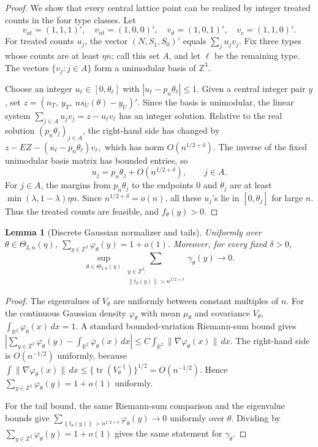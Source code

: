 \documentclass[12pt,reqno]{amsart}
\theoremstyle{theorem}
\newtheorem{lem}{Lemma}[section]
\theoremstyle{definition}
\newcommand{\0}{\mathbf{0}}
\newcommand{\1}{\mathbf{1}}
\begin{document}
\begin{proof}
We show that every central lattice point can be realized by integer treated
counts in the four type classes.  Let
\[
v_{at}=(1,1,1)',\quad
v_{nt}=(1,0,0)',\quad
v_d=(1,0,1)',\quad
v_c=(1,1,0)'.
\]
For treated counts \(u_j\), the vector \((N,S_1,S_0)'\) equals
\(\sum_j u_jv_j\).  Fix three types whose counts are at least \(\eta n\); call
this set \(A\), and let \(\ell\) be the remaining type.  The vectors
\(\{v_j:j\in A\}\) form a unimodular basis of \(\mathbb Z^3\).

Choose an integer \(u_\ell\in[0,\theta_\ell]\) with
\(|u_\ell-p_n\theta_\ell|\le1\).  Given a central integer pair \(y\), set
\(
z=(n_T,\ y_T,\ ns_U(\theta)-y_U)'.
\)
Since the basis is unimodular, the linear system
\(
\sum_{j\in A}u_jv_j=z-u_\ell v_\ell
\)
has an integer solution.  Relative to the real solution
\((p_n\theta_j)_{j\in A}\), the right-hand side has changed by
\(
z-E Z-(u_\ell-p_n\theta_\ell)v_\ell,
\)
which has norm \(O(n^{1/2+\delta})\).  The inverse of the fixed unimodular basis
matrix has bounded entries, so
\[
u_j=p_n\theta_j+O(n^{1/2+\delta}),\qquad j\in A.
\]
For \(j\in A\), the margins from \(p_n\theta_j\) to the endpoints \(0\) and
\(\theta_j\) are at least \(\min(\lambda,1-\lambda)\eta n\).  Since
\(n^{1/2+\delta}=o(n)\), all these \(u_j\)'s lie in \([0,\theta_j]\) for large
\(n\).  Thus the treated counts are feasible, and \(f_\theta(y)>0\).
\end{proof}

\begin{lem}[Discrete Gaussian normalizer and tails]\label{lem:gaussian-normalizer}
Uniformly over \(\theta\in\Theta_{3,n}(\eta)\),
\(
\sum_{y\in\mathbb Z^2}\varphi_\theta(y)=1+o(1).
\)
Moreover, for every fixed \(\delta>0\),
\[
\sup_{\theta\in\Theta_{3,n}(\eta)}
\sum_{\substack{y\in\mathbb Z^2: \\ \|t_\theta(y)\|>n^{1/2+\delta}}}\gamma_\theta(y)\to0.
\]
\end{lem}

\begin{proof}
The eigenvalues of \(V_\theta\) are uniformly between constant multiples of
\(n\).  For the continuous Gaussian density \(\varphi_\theta\) with mean
\(\mu_\theta\) and covariance \(V_\theta\),
\(
\int_{\mathbb R^2}\varphi_\theta(x)\,dx=1.
\)
A standard bounded-variation Riemann-sum bound gives
\(
\left|
\sum_{y\in\mathbb Z^2}\varphi_\theta(y)
-\int_{\mathbb R^2}\varphi_\theta(x)\,dx
\right|
\le
C\int_{\mathbb R^2}\|\nabla\varphi_\theta(x)\|\,dx.
\)
The right-hand side is \(O(n^{-1/2})\) uniformly, because
\(
\int\|\nabla\varphi_\theta(x)\|\,dx
\le
\{\operatorname{tr}(V_\theta^{-1})\}^{1/2}
=O(n^{-1/2}).
\)
Hence \(\sum_{y\in\mathbb Z^2}\varphi_\theta(y)=1+o(1)\) uniformly.

For the tail bound, the same Riemann-sum comparison and the eigenvalue bounds
give
\(
\sum_{\|t_\theta(y)\|>n^{1/2+\delta}}\varphi_\theta(y)\to0
\)
uniformly over \(\theta\).  Dividing by
\(\sum_{y\in\mathbb Z^2}\varphi_\theta(y)=1+o(1)\) gives the same statement for
\(\gamma_\theta\).
\end{proof}
\end{document}
